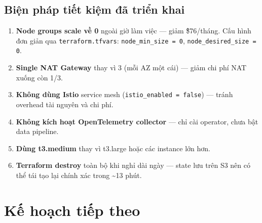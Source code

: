 \documentclass[12pt,a4paper]{article}
\begin{document}
\subsection{Biện pháp tiết kiệm đã triển khai}

\begin{enumerate}[leftmargin=*,nosep]
  \item \textbf{Node groups scale về 0} ngoài giờ làm việc — giảm \~\$76/tháng. Cấu hình đơn giản qua \texttt{terraform.tfvars}: \texttt{node\_min\_size = 0}, \texttt{node\_desired\_size = 0}.
  \item \textbf{Single NAT Gateway} thay vì 3 (mỗi AZ một cái) — giảm chi phí NAT xuống còn 1/3.
  \item \textbf{Không dùng Istio} service mesh (\texttt{istio\_enabled = false}) — tránh overhead tài nguyên và chi phí.
  \item \textbf{Không kích hoạt OpenTelemetry collector} — chỉ cài operator, chưa bật data pipeline.
  \item \textbf{Dùng t3.medium} thay vì t3.large hoặc các instance lớn hơn.
  \item \textbf{Terraform destroy} toàn bộ khi nghỉ dài ngày — state lưu trên S3 nên có thể tái tạo lại chính xác trong \textasciitilde 13 phút.
\end{enumerate}

\section{Kế hoạch tiếp theo}
\end{document}

